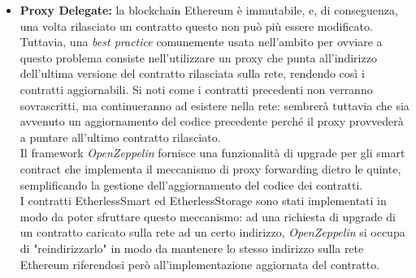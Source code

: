 \begin{itemize}
  \item \textbf{Proxy Delegate:} la blockchain Ethereum è immutabile, e, di conseguenza, una volta rilasciato un contratto questo non può più essere modificato. Tuttavia, una \textit{best practice} comunemente usata nell'ambito per ovviare a questo problema consiste nell'utilizzare un proxy che punta all'indirizzo dell'ultima versione del contratto rilasciata sulla rete, rendendo così i contratti aggiornabili. Si noti come i contratti precedenti non verranno sovrascritti, ma continueranno ad esistere nella rete: sembrerà tuttavia che sia avvenuto un aggiornamento del codice precedente perché il proxy provvederà a puntare all'ultimo contratto rilasciato. \\
    Il framework \textit{OpenZeppelin} fornisce una funzionalità di upgrade per gli smart contract che implementa il meccanismo di proxy forwarding dietro le quinte, semplificando la gestione dell'aggiornamento del codice dei contratti. \\
    I contratti EtherlessSmart ed EtherlessStorage sono stati implementati in modo da poter sfruttare questo meccanismo: ad una richiesta di upgrade di un contratto caricato sulla rete ad un certo indirizzo, \textit{OpenZeppelin} si occupa di "reindirizzarlo" in modo da mantenere lo stesso indirizzo sulla rete Ethereum riferendosi però all'implementazione aggiornata del contratto.
 \end{itemize}

